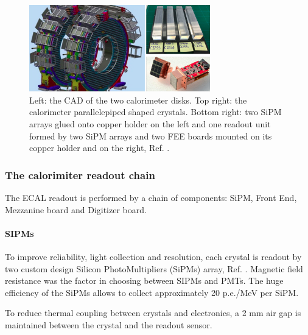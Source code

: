 \begin{figure}[!h]
    \centering
    \includegraphics[width =0.7\textwidth]{figures/png/Screenshot_20240322_121000.png}
    \caption{Left: the CAD of the two calorimeter disks. Top right: the calorimeter parallelepiped shaped crystals.
            Bottom right: two SiPM arrays glued onto copper holder on the left and one readout 
            unit formed by two SiPM arrays and two FEE boards mounted on its
            copper holder and on the right, Ref. \cite{em4}.}
    \label{fig:calo2}
\end{figure}
\subsubsection{The calorimiter readout chain}
The ECAL readout is performed by a chain of components: SiPM, Front End, Mezzanine board
and Digitizer board.
\paragraph{SIPMs}
To improve reliability, light collection and resolution, each 
crystal is readout by two custom design Silicon PhotoMultipliers (SiPMs) array, Ref. \cite{em1}. 
Magnetic field resistance was the factor in choosing between SIPMs and PMTs.
The huge efficiency of the SiPMs allows to collect approximately 20 p.e./MeV per SiPM.

To reduce thermal coupling between crystals and electronics, a 2 mm air gap is maintained 
between the crystal and the readout sensor. 

